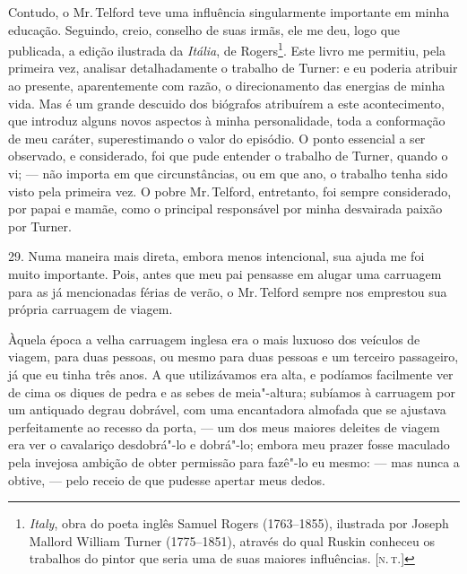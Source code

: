 Contudo, o Mr.\,Telford teve uma influência singularmente importante em
minha educação. Seguindo, creio, conselho de suas irmãs, ele me deu,
logo que publicada, a edição ilustrada da \emph{Itália}, de
Rogers\footnote{\emph{Italy}, obra do poeta inglês Samuel Rogers
  (1763--1855), ilustrada por Joseph Mallord William Turner (1775--1851),
  através do qual Ruskin conheceu os trabalhos do pintor que seria uma
  de suas maiores influências. {[}\textsc{n.\,t.}{]}}. Este livro me permitiu,
pela primeira vez, analisar detalhadamente o trabalho de Turner: e eu
poderia atribuir ao presente, aparentemente com razão, o direcionamento
das energias de minha vida. Mas é um grande descuido dos biógrafos
atribuírem a este acontecimento, que introduz alguns novos aspectos à
minha personalidade, toda a conformação de meu caráter, superestimando o
valor do episódio. O ponto essencial a ser observado, e considerado, foi
que pude entender o trabalho de Turner, quando o vi; --- não importa em
que circunstâncias, ou em que ano, o trabalho tenha sido visto pela
primeira vez. O pobre Mr.\,Telford, entretanto, foi sempre considerado,
por papai e mamãe, como o principal responsável por minha desvairada
paixão por Turner.

29. Numa maneira mais direta, embora menos intencional, sua ajuda me foi
muito importante. Pois, antes que meu pai pensasse em alugar uma
carruagem para as já mencionadas férias de verão, o Mr.\,Telford sempre
nos emprestou sua própria carruagem de viagem.

Àquela época a velha carruagem inglesa era o mais luxuoso dos veículos
de viagem, para duas pessoas, ou mesmo para duas pessoas e um terceiro
passageiro, já que eu tinha três anos. A que utilizávamos era alta, e
podíamos facilmente ver de cima os diques de pedra e as sebes de
meia"-altura; subíamos à carruagem por um antiquado degrau dobrável, com
uma encantadora almofada que se ajustava perfeitamente ao recesso da
porta, --- um dos meus maiores deleites de viagem era ver o cavalariço
desdobrá"-lo e dobrá"-lo; embora meu prazer fosse maculado pela invejosa
ambição de obter permissão para fazê"-lo eu mesmo: --- mas nunca a obtive,
--- pelo receio de que pudesse apertar meus dedos.

